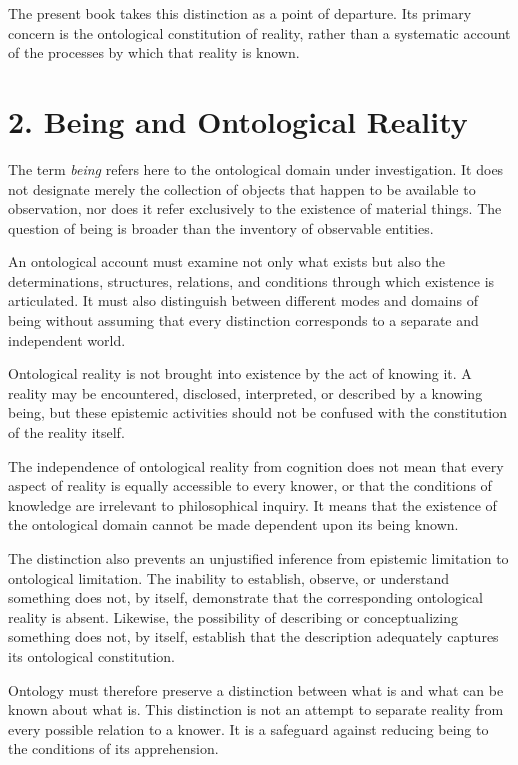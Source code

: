 The present book takes this distinction as a point of
departure. Its primary concern is the ontological constitution
of reality, rather than a systematic account of the processes
by which that reality is known.


\section*{2. Being and Ontological Reality}

The term \textit{being} refers here to the ontological domain
under investigation. It does not designate merely the
collection of objects that happen to be available to
observation, nor does it refer exclusively to the existence
of material things. The question of being is broader than
the inventory of observable entities.

An ontological account must examine not only what exists
but also the determinations, structures, relations, and
conditions through which existence is articulated. It must
also distinguish between different modes and domains of
being without assuming that every distinction corresponds
to a separate and independent world.

Ontological reality is not brought into existence by the
act of knowing it. A reality may be encountered, disclosed,
interpreted, or described by a knowing being, but these
epistemic activities should not be confused with the
constitution of the reality itself.

The independence of ontological reality from cognition
does not mean that every aspect of reality is equally
accessible to every knower, or that the conditions of
knowledge are irrelevant to philosophical inquiry. It
means that the existence of the ontological domain cannot
be made dependent upon its being known.

The distinction also prevents an unjustified inference
from epistemic limitation to ontological limitation.
The inability to establish, observe, or understand
something does not, by itself, demonstrate that the
corresponding ontological reality is absent. Likewise,
the possibility of describing or conceptualizing something
does not, by itself, establish that the description
adequately captures its ontological constitution.

Ontology must therefore preserve a distinction between
what is and what can be known about what is. This distinction
is not an attempt to separate reality from every possible
relation to a knower. It is a safeguard against reducing
being to the conditions of its apprehension.

